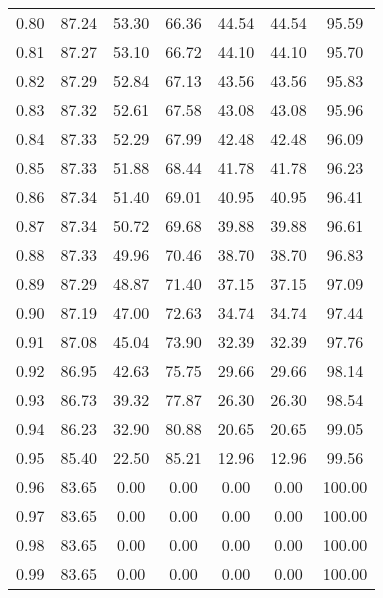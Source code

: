 \begin{tabular}{|c|c|c|c|c|c|c|}
      0.80 &     87.24 &     53.30 &      66.36 &   44.54 &      44.54 &         95.59 \\
      0.81 &     87.27 &     53.10 &      66.72 &   44.10 &      44.10 &         95.70 \\
      0.82 &     87.29 &     52.84 &      67.13 &   43.56 &      43.56 &         95.83 \\
      0.83 &     87.32 &     52.61 &      67.58 &   43.08 &      43.08 &         95.96 \\
      0.84 &     87.33 &     52.29 &      67.99 &   42.48 &      42.48 &         96.09 \\
      0.85 &     87.33 &     51.88 &      68.44 &   41.78 &      41.78 &         96.23 \\
      0.86 &     87.34 &     51.40 &      69.01 &   40.95 &      40.95 &         96.41 \\
      0.87 &     87.34 &     50.72 &      69.68 &   39.88 &      39.88 &         96.61 \\
      0.88 &     87.33 &     49.96 &      70.46 &   38.70 &      38.70 &         96.83 \\
      0.89 &     87.29 &     48.87 &      71.40 &   37.15 &      37.15 &         97.09 \\
      0.90 &     87.19 &     47.00 &      72.63 &   34.74 &      34.74 &         97.44 \\
      0.91 &     87.08 &     45.04 &      73.90 &   32.39 &      32.39 &         97.76 \\
      0.92 &     86.95 &     42.63 &      75.75 &   29.66 &      29.66 &         98.14 \\
      0.93 &     86.73 &     39.32 &      77.87 &   26.30 &      26.30 &         98.54 \\
      0.94 &     86.23 &     32.90 &      80.88 &   20.65 &      20.65 &         99.05 \\
      0.95 &     85.40 &     22.50 &      85.21 &   12.96 &      12.96 &         99.56 \\
      0.96 &     83.65 &      0.00 &       0.00 &    0.00 &       0.00 &        100.00 \\
      0.97 &     83.65 &      0.00 &       0.00 &    0.00 &       0.00 &        100.00 \\
      0.98 &     83.65 &      0.00 &       0.00 &    0.00 &       0.00 &        100.00 \\
      0.99 &     83.65 &      0.00 &       0.00 &    0.00 &       0.00 &        100.00 \\
\bottomrule
\end{tabular}
